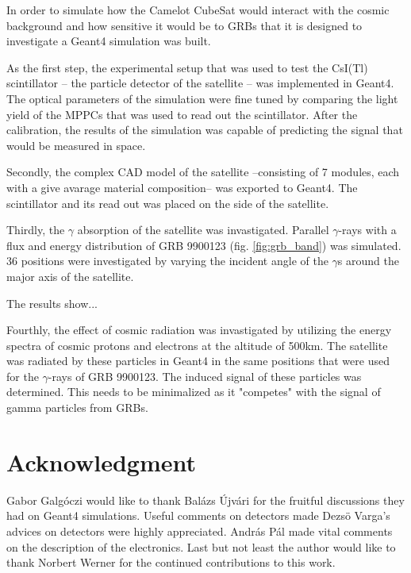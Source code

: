 \documentclass[12pt, a4paper,titlepage]{article}
\numberwithin{equation}{section}
\numberwithin{figure}{section}
\begin{document}
In order to simulate how the Camelot CubeSat would interact with the cosmic background and how sensitive it would be to GRBs that it is designed to investigate a Geant4 simulation was built.

As the first step, the experimental setup that was used to test the CsI(Tl) scintillator -- the particle detector of the satellite -- was implemented in Geant4. The optical parameters of the simulation were fine tuned by comparing the light yield of the MPPCs that was used to read out the scintillator. After the calibration, the results of the simulation was capable of predicting the signal that would be measured in space.

Secondly, the complex CAD model of the satellite --consisting of 7 modules, each with a give avarage material composition-- was exported to Geant4. The scintillator and its read out was placed on the side of the satellite.

Thirdly, the $\gamma$ absorption of the satellite was invastigated. Parallel $\gamma$-rays with a flux and energy distribution of GRB 9900123 (fig. \ref{fig:grb_band}) was simulated. 36 positions were investigated by varying the incident angle of the $\gamma$s around the major axis of the satellite.

The results show...


Fourthly, the effect of cosmic radiation was invastigated by utilizing the energy spectra of cosmic protons and electrons at the altitude of 500km. The satellite was radiated by these particles in Geant4 in the same positions that were used for the $\gamma$-rays of GRB 9900123. The induced signal of these particles was determined. This needs to be minimalized as it "competes" with the signal of gamma particles from GRBs.


\pagebreak

\section{Acknowledgment}

Gabor Galg\'oczi would like to thank Bal\'azs \'Ujv\'ari for the fruitful discussions they had on Geant4 simulations. Useful comments on detectors made Dezs\"o Varga's advices on detectors were highly appreciated. András Pál made vital comments on the description of the electronics. Last but not least the author would like to thank Norbert Werner for the continued contributions to this work.

\pagebreak
\end{document}
